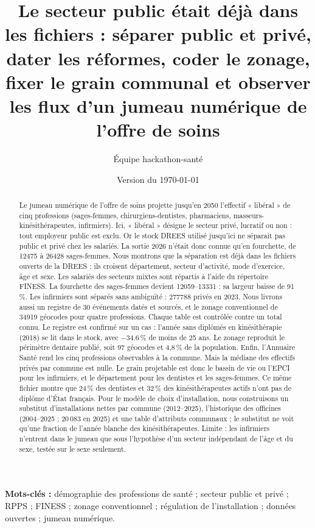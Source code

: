 \documentclass[11pt]{article}
\title{Le secteur public était déjà dans les fichiers : séparer public et privé, dater les réformes, coder le zonage, fixer le grain communal et observer les flux d'un jumeau numérique de l'offre de soins}
\author[1]{Équipe hackathon-santé}
\affil[1]{Projet « jumeau numérique de l'offre de soins », dépôt \texttt{hackathon-sante/v2}, axe~4 (données)}
\date{Version du \today}
\begin{document}
\maketitle

\begin{abstract}
Le jumeau numérique de l'offre de soins projette jusqu'en 2050 l'effectif « libéral » de cinq professions
(sages-femmes, chirurgiens-dentistes, pharmaciens, masseurs-kinésithérapeutes, infirmiers). Ici, « libéral »
désigne le secteur privé, lucratif ou non : tout employeur public est exclu. Or le stock DREES utilisé jusqu'ici
ne séparait pas public et privé chez les salariés. La sortie 2026 n'était donc connue qu'en fourchette, de
\num{12475} à \num{26428} sages-femmes. Nous montrons que la séparation est déjà dans les fichiers ouverts de la
DREES : ils croisent département, secteur d'activité, mode d'exercice, âge et sexe. Les salariés des secteurs
mixtes sont répartis à l'aide du répertoire FINESS. La fourchette des sages-femmes devient
\num{12059}--\num{13331}\mesure{} : sa largeur baisse de 91\,\%\derive{}. Les infirmiers sont séparés sans
ambiguïté : \num{277788} privés en 2023\mesure{}. Nous livrons aussi un registre de 30 événements datés et
sourcés, et le zonage conventionnel de \num{34919} géocodes pour quatre professions. Chaque table est contrôlée
contre un total connu. Le registre est confirmé sur un cas : l'année sans diplômés en kinésithérapie (2018) se
lit dans le stock, avec \num{-34.6}\,\% de moins de 25 ans\mesure{}. Le zonage reproduit le périmètre dentaire
publié, soit 97 géocodes et 4,8\,\% de la population\mesure{}. Enfin, l'Annuaire Santé rend les cinq
professions observables à la commune. Mais la médiane des effectifs privés par commune est nulle. Le grain
projetable est donc le bassin de vie ou l'EPCI pour les infirmiers, et le département pour les dentistes et les
sages-femmes. Ce même fichier montre que 24\,\% des dentistes et 32\,\% des kinésithérapeutes actifs n'ont pas
de diplôme d'État français\mesure{}. Pour le modèle de choix d'installation, nous construisons un substitut
d'installations nettes par commune (2012--2025), l'historique des officines (2004--2025 ; 20\,083 en 2025) et une
table d'attributs communaux ; le substitut ne voit qu'une fraction de l'année blanche des kinésithérapeutes. Limite : les infirmiers n'entrent dans le jumeau que sous l'hypothèse d'un
secteur indépendant de l'âge et du sexe, testée sur le sexe seulement.
\end{abstract}
\noindent\textbf{Mots-clés :} démographie des professions de santé ; secteur public et privé ; RPPS ; FINESS ;
zonage conventionnel ; régulation de l'installation ; données ouvertes ; jumeau numérique.
\end{document}
